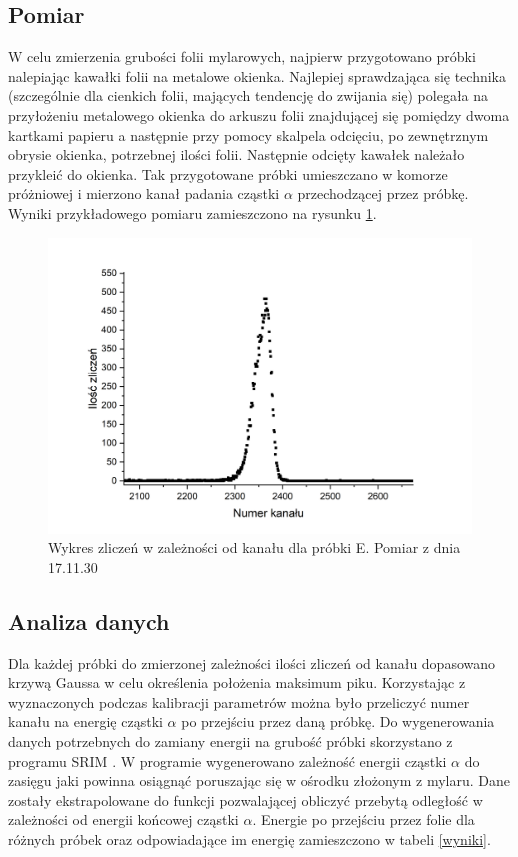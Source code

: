 \documentclass[12pt,a4paper]{article}
\begin{document}
\subsection{Pomiar}

W celu zmierzenia grubości folii mylarowych, najpierw przygotowano próbki nalepiając kawałki folii na metalowe okienka. Najlepiej sprawdzająca się technika (szczególnie dla cienkich folii, mających tendencję do zwijania się) polegała na przyłożeniu metalowego okienka do arkuszu folii znajdującej się pomiędzy dwoma kartkami papieru a następnie przy pomocy skalpela odcięciu, po zewnętrznym obrysie okienka, potrzebnej ilości folii. Następnie odcięty kawałek należało przykleić do okienka. Tak przygotowane próbki umieszczano w komorze próżniowej i mierzono kanał padania cząstki $\alpha$ przechodzącej przez próbkę. Wyniki przykładowego pomiaru zamieszczono na rysunku  \ref{przykladowy_pomiar}.




\begin{figure}[H]
\centering
\includegraphics[scale=0.5]{Enlarged.png}
\caption{Wykres zliczeń w zależności od kanału dla próbki E. Pomiar z dnia 17.11.30}
\label{przykladowy_pomiar}
\end{figure}


\subsection{Analiza danych}
Dla każdej próbki do zmierzonej zależności ilości zliczeń od kanału dopasowano krzywą Gaussa w celu określenia położenia maksimum piku. Korzystając z wyznaczonych podczas kalibracji parametrów można było przeliczyć numer kanału na energię cząstki $\alpha$ po przejściu przez daną próbkę. 
Do wygenerowania danych potrzebnych do zamiany energii na grubość próbki skorzystano z programu SRIM \cite{srim}. W programie wygenerowano zależność energii cząstki $\alpha$ do zasięgu jaki powinna osiągnąć poruszając się w ośrodku złożonym z mylaru. Dane zostały ekstrapolowane do funkcji pozwalającej obliczyć przebytą odległość w zależności od energii końcowej cząstki $\alpha$. Energie po przejściu przez folie dla różnych próbek oraz odpowiadające im energię zamieszczono w tabeli \ref{wyniki}. 
\end{document}
